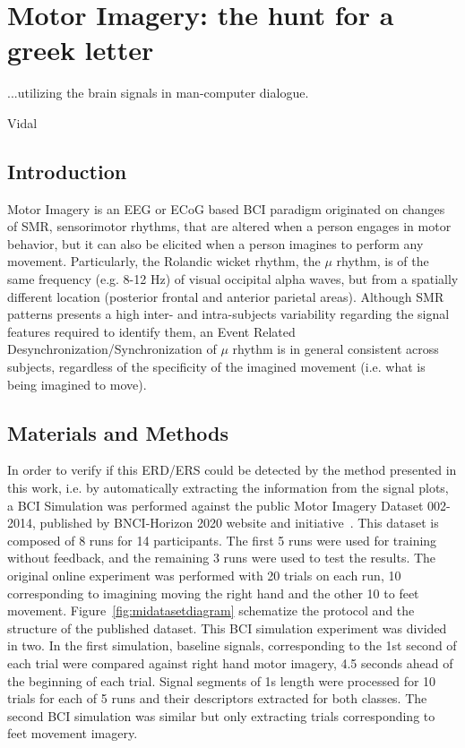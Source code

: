 \chapter{Motor Imagery: the hunt for a greek letter}
\label{chapter:five}
\epigraph{...utilizing the brain signals in man-computer dialogue.}{Vidal}

\section{Introduction}

Motor Imagery is an EEG or ECoG based BCI paradigm originated on changes of SMR, sensorimotor rhythms, that are altered when a person engages in motor behavior, but it can also be elicited when a person imagines to perform any movement. Particularly, the Rolandic wicket rhythm, the $\mu$ rhythm, is of the same frequency (e.g. 8-12 Hz) of visual occipital alpha waves, but from a spatially different location (posterior frontal and anterior parietal areas)\cite{WolpawJonathanR2012}.   Although SMR patterns presents a high inter- and intra-subjects variability regarding the signal features required to identify them, an Event Related Desynchronization/Synchronization of $\mu$ rhythm is in general consistent across subjects, regardless of the specificity of the imagined movement (i.e. what is being imagined to move).

\section{Materials and Methods}

In order to verify if this ERD/ERS could be detected by the method presented in this work, i.e. by automatically extracting the information from the signal plots, a BCI Simulation was performed against the public Motor Imagery Dataset 002-2014, published by BNCI-Horizon 2020 website and initiative~\cite{Steyrl2015}.  This dataset is composed of 8 runs for 14 participants.  The first 5 runs were used for training without feedback, and the remaining 3 runs were used to test the results.  The original online experiment was performed with 20 trials on each run, 10 corresponding to imagining moving the right hand and the other 10 to feet movement.  Figure~\ref{fig:midatasetdiagram} schematize the protocol and the structure of the published dataset.  This BCI simulation experiment was divided in two.  In the first simulation, baseline signals, corresponding to the 1st second of each trial were compared against right hand motor imagery, 4.5 seconds ahead of the beginning of each trial. Signal segments of 1s length were processed for 10 trials for each of 5 runs and their descriptors extracted for both classes.  The second BCI simulation was similar but only extracting trials corresponding to feet movement imagery.

